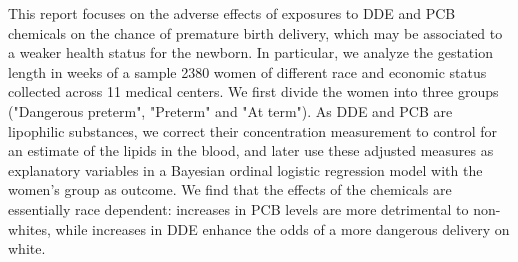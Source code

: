 This report focuses on the adverse effects of exposures to DDE and PCB chemicals on the chance of premature birth delivery, which may be associated to a weaker health status for the newborn. In particular, we analyze the gestation length in weeks of a sample 2380 women of different race and economic status collected across 11 medical centers. We first divide the women into three groups ("Dangerous preterm", "Preterm" and "At term").  As DDE and PCB are lipophilic substances, we correct their concentration measurement to control for an estimate of the lipids in the blood, and later use these adjusted measures as explanatory variables in a Bayesian ordinal logistic regression model with the women's group as outcome. We find that the effects of the chemicals are essentially race dependent: increases in PCB levels are more detrimental to non-whites, while increases in DDE enhance the odds of a more dangerous delivery on white. 